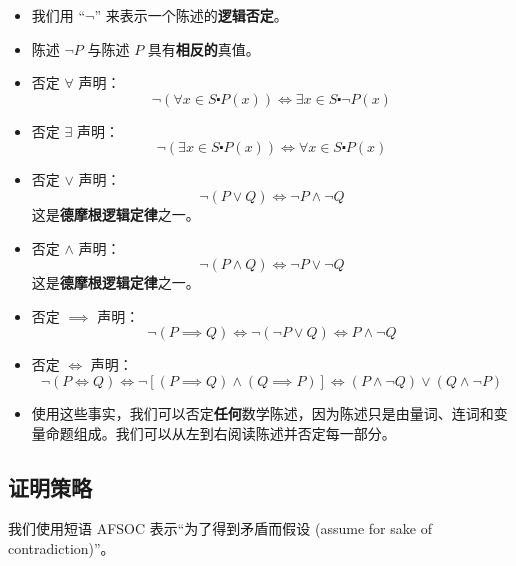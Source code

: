 \begin{itemize}
    \item 我们用 ``$\neg$'' 来表示一个陈述的\textbf{逻辑否定}。
    \item 陈述 $\neg P$ 与陈述 $P$ 具有\textbf{相反的}真值。
    \item 否定 $\forall$ 声明：
        \[\neg (\forall x \in S \centerdot P(x)) \iff \exists x \in S \centerdot \neg P(x)\]
    \item 否定 $\exists$ 声明：
        \[\neg (\exists x \in S \centerdot P(x)) \iff \forall x \in S \centerdot P(x)\]
    \item 否定 $\lor$ 声明：
        \[\neg (P \lor Q) \iff \neg P \land \neg Q\]
        这是\textbf{德摩根逻辑定律}之一。
    \item 否定 $\land$ 声明：
        \[\neg (P \land Q) \iff \neg P \lor \neg Q\]
        这是\textbf{德摩根逻辑定律}之一。
    \item 否定 $\implies$ 声明：
        \[\neg(P \implies Q) \iff \neg(\neg P \lor Q) \iff P \land \neg Q\]
    \item 否定 $\iff$ 声明：
        \[\neg (P \iff Q) \iff \neg [(P \implies Q) \land (Q \implies P)] \iff (P \land \neg Q) \lor (Q \land \neg P)\]
    \item 使用这些事实，我们可以否定\textbf{任何}数学陈述，因为陈述只是由量词、连词和变量命题组成。我们可以从左到右阅读陈述并否定每一部分。
\end{itemize}

\subsection{证明策略}

我们使用短语 AFSOC 表示``为了得到矛盾而假设 (assume for sake of contradiction)''。

